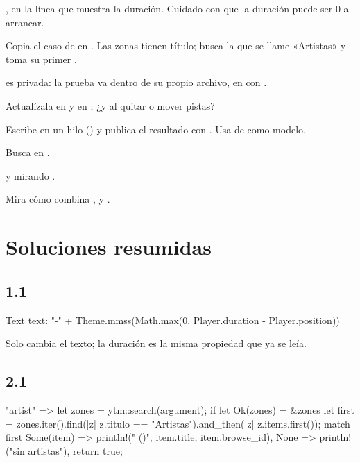 \begin{description}[style=nextline, leftmargin=0pt]
  \item[1.1] , en la línea que muestra la
  duración. Cuidado con que la duración puede ser 0 al arrancar.
  \item[2.1] Copia el caso  de  en . Las zonas
  tienen título; busca la que se llame «Artistas» y toma su primer .
  \item[2.2]  es privada: la prueba va dentro de su propio archivo, en
   con .
  \item[3.1] Actualízala en  y en ; ¿y al quitar o mover pistas?
  \item[3.3] Escribe en un hilo () y publica el resultado con
  . Usa  de  como modelo.
  \item[4.1] Busca  en .
  \item[5.2]  y  mirando
  .
  \item[6.2] Mira cómo  combina ,  y
  .
\end{description}

\section{Soluciones resumidas}

\subsection*{1.1}

\begin{qml}
Text {
    text: "-" + Theme.mmss(Math.max(0, Player.duration - Player.position))
}
\end{qml}

Solo cambia el texto; la duración es la misma propiedad que ya se leía.

\subsection*{2.1}

\begin{rust}
"artist" => {
    let zones = ytm::search(argument);
    if let Ok(zones) = &zones {
        let first = zones.iter().find(|z| z.titulo == "Artistas").and_then(|z| z.items.first());
        match first {
            Some(item) => println!("{} ({})", item.title, item.browse_id),
            None => println!("sin artistas"),
        }
    }
    return true;
}
\end{rust}


